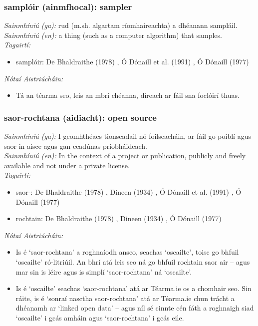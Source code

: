 \documentclass{article}
\begin{document}
\subsubsection*{samplóir (ainmfhocal): sampler}
 \noindent \textit{Sainmhíniú (ga):} rud (m.sh. algartam ríomhaireachta) a dhéanann sampláil.
\\
 \noindent \textit{Sainmhíniú (en):} a thing (such as a computer algorithm) that samples.
\\
 \noindent \textit{Tagairtí:}
\begin{itemize}
	\item samplóir: De Bhaldraithe (1978) \cite{de-bhaldraithe}, Ó Dónaill et al. (1991) \cite{focloir-beag}, Ó Dónaill (1977) \cite{odonaill}
\end{itemize}

 \noindent \textit{Nótaí Aistriúcháin:}
\begin{itemize}
	\item Tá an téarma seo, leis an mbrí chéanna, díreach ar fáil sna foclóirí thuas.
\end{itemize}


\subsubsection*{saor-rochtana (aidiacht): open source}
 \noindent \textit{Sainmhíniú (ga):} I gcomhthéacs tionscadail nó foilseacháin, ar fáil go poiblí agus saor in aisce agus gan ceadúnas príobháideach.
\\
 \noindent \textit{Sainmhíniú (en):} In the context of a project or publication, publicly and freely available and not under a private license.
\\
 \noindent \textit{Tagairtí:}
\begin{itemize}
	\item saor-: De Bhaldraithe (1978) \cite{de-bhaldraithe}, Dineen (1934) \cite{dineen}, Ó Dónaill et al. (1991) \cite{focloir-beag}, Ó Dónaill (1977) \cite{odonaill}
	\item rochtain: De Bhaldraithe (1978) \cite{de-bhaldraithe}, Dineen (1934) \cite{dineen}, Ó Dónaill (1977) \cite{odonaill}
\end{itemize}

 \noindent \textit{Nótaí Aistriúcháin:}
\begin{itemize}
	\item Is é `saor-rochtana' a roghnaíodh anseo, seachas `oscailte', toisc go bhfuil `oscailte' ró-litriúil. An bhrí atá leis seo ná go bhfuil rochtain saor air -- agus mar sin is léire agus is simplí `saor-rochtana' ná `oscailte'.
	\item Is é `oscailte' seachas `saor-rochtana' atá ar Téarma.ie os a chomhair seo. Sin ráite, is é `sonraí nasctha saor-rochtana' atá ar Téarma.ie chun trácht a dhéanamh ar `linked open data' -- agus níl sé cinnte cén fáth a roghnaigh siad `oscailte' i gcás amháin agus `saor-rochtana' i gcás eile.
\end{itemize}
\end{document}
